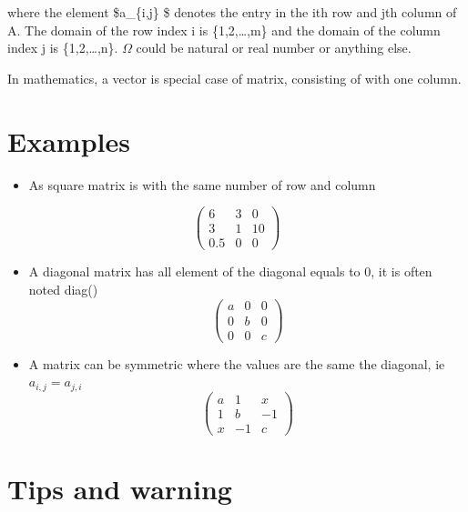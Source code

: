 \documentclass[
  letterpaper,
  DIV=11,
  numbers=noendperiod]{scrreprt}
\providecommand{\tightlist}{%
  \setlength{\itemsep}{0pt}\setlength{\parskip}{0pt}}
\begin{document}
where the element \$a\_\{i,j\} \in \Omega \$ denotes the entry in the
ith row and jth column of A. The domain of the row index i is
\{1,2,\ldots,m\} and the domain of the column index j is
\{1,2,\ldots,n\}. \(\Omega\) could be natural or real number or anything
else.

In mathematics, a vector is special case of matrix, consisting of with
one column.

\section*{Examples}\label{examples-4}


\begin{itemize}
\tightlist
\item
  As square matrix is with the same number of row and column
\end{itemize}

\[
\begin{pmatrix}
6 & 3 & 0 \\
3 & 1 & 10 \\
0.5 & 0 & 0
\end{pmatrix}
\]

\begin{itemize}
\item
  A diagonal matrix has all element of the diagonal equals to 0, it is
  often noted diag() \[
  \begin{pmatrix}
  a & 0 & 0 \\
  0 & b & 0 \\
  0 & 0 & c
  \end{pmatrix}
  \]
\item
  A matrix can be symmetric where the values are the same the diagonal,
  ie \(a_{i,j} = a_{j,i}\) \[
  \begin{pmatrix}
  a & 1 & x \\
  1 & b & -1 \\
  x & -1 & c
  \end{pmatrix}
  \]
\end{itemize}

\section*{Tips and warning}\label{tips-and-warning-3}

\end{document}
